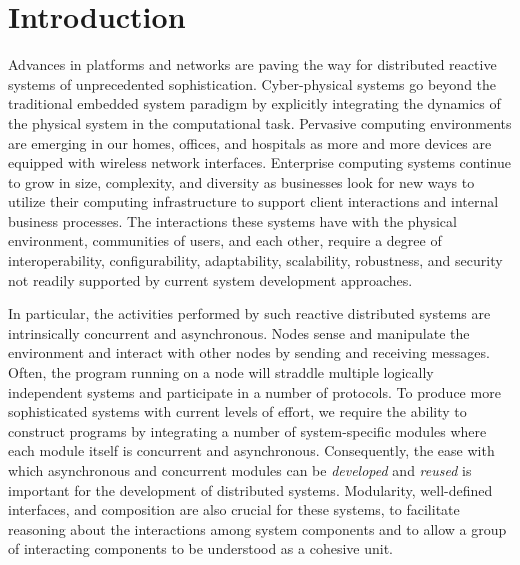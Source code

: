 \section{Introduction\label{introduction}}

Advances in platforms and networks are paving the way for distributed reactive systems of unprecedented sophistication.
Cyber-physical systems go beyond the traditional embedded system paradigm by explicitly integrating the dynamics of the physical system in the computational task.
Pervasive computing environments are emerging in our homes, offices, and hospitals as more and more devices are equipped with wireless network interfaces.
Enterprise computing systems continue to grow in size, complexity, and diversity as businesses look for new ways to utilize their computing infrastructure to support client interactions and internal business processes.
The interactions these systems have with the physical environment, communities of users, and each other, require a degree of interoperability, configurability, adaptability, scalability, robustness, and security not readily supported by current system development approaches.

In particular, the activities performed by such reactive distributed systems are intrinsically concurrent and asynchronous.
Nodes sense and manipulate the environment and interact with other nodes by sending and receiving messages.
Often, the program running on a node will straddle multiple logically independent systems and participate in a number of protocols.
To produce more sophisticated systems with current levels of effort, we require the ability to construct programs by integrating a number of system-specific modules where each module itself is concurrent and asynchronous.
Consequently, the ease with which asynchronous and concurrent modules can be \emph{developed} and \emph{reused} is important for the development of distributed systems.
Modularity, well-defined interfaces, and composition are also crucial for these systems, to facilitate reasoning about the interactions among system components and to allow a group of interacting components to be understood as a cohesive unit.

